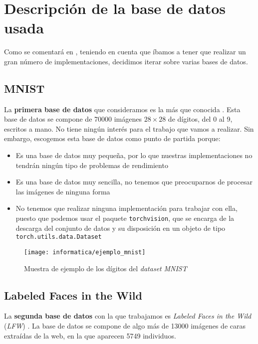 \section{Descripción de la base de datos usada} \label{isec:base_datos_usada}

Como se comentará en , teniendo en cuenta que íbamos a tener que realizar un gran número de implementaciones, decidimos iterar sobre varias bases de datos.

\subsection{MNIST}

La \textbf{primera base de datos} que consideramos es la más que conocida  \cite{informatica:mnist}. Esta base de datos se compone de 70000 imágenes $28 \times 28$ de dígitos, del 0 al 9, escritos a mano. No tiene ningún interés para el trabajo que vamos a realizar. Sin embargo, escogemos esta base de datos como punto de partida porque:

\begin{itemize}
    \item Es una base de datos muy pequeña, por lo que nuestras implementaciones no tendrán ningún tipo de problemas de rendimiento
    \item Es una base de datos muy sencilla, no tenemos que preocuparnos de procesar las imágenes de ninguna forma
    \item No tenemos que realizar ninguna implementación para trabajar con ella, puesto que podemos usar el paquete \lstinline{torchvision}, que se encarga de la descarga del conjunto de datos y su disposición en un objeto de tipo \lstinline{torch.utils.data.Dataset}
\end{itemize}

\begin{figure}[H]
    \centering
    \texttt{[image: informatica/ejemplo\_mnist]}
    \caption{Muestra de ejemplo de los dígitos del \textit{dataset} \textit{MNIST}}
\end{figure}


\subsection{Labeled Faces in the Wild}

La \textbf{segunda base de datos} con la que trabajamos es \textit{Labeled Faces in the Wild} (\textit{LFW}) \cite{informatica:lfw_dataset}. La base de datos se compone de algo más de 13000 imágenes de caras extraídas de la web, en la que aparecen 5749 individuos.

